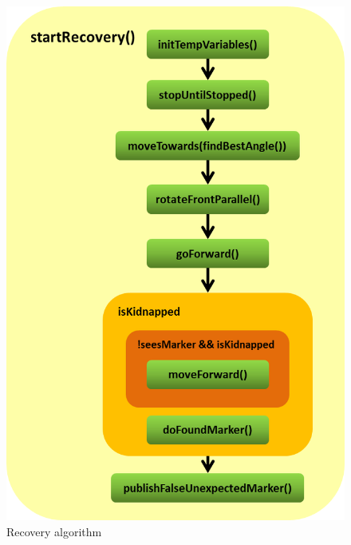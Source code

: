 \begin{figure}[htb]
\centering
\includegraphics[scale=0.8]{graphics/start_recovery.png}
\caption{Recovery algorithm}
\label{start_recovery}
\centering
\end{figure}

